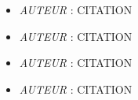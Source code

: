\setlength{\parindent}{0cm}



\begin{itemize}



\item \textit{AUTEUR} : \og CITATION \fg{}

\item \textit{AUTEUR} : \og CITATION \fg{}

\item \textit{AUTEUR} : \og CITATION \fg{}

\item \textit{AUTEUR} : \og CITATION \fg{}



\end{itemize}